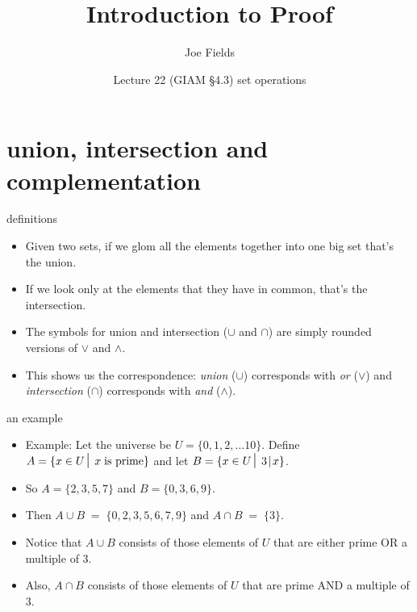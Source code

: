 \documentclass[handout,landscape]{beamer}
\author{Joe Fields}
\title{Introduction to Proof}
\date{Lecture 22 (GIAM \S 4.3) \newline set operations}
\institute[SCSU]{ {\tt fieldsj1@southernct.edu} }
\begin{document}
\begin{frame}[plain]
  \titlepage
\end{frame}

\section{union, intersection and complementation}

\begin{frame}{definitions}
\begin{itemize}
\item Given two sets, if we glom all the elements together into one big set that's the union. \pause
\item If we look only at the elements that they have in common, that's the intersection. \pause
\item The symbols for union and intersection ($\cup$ and $\cap$) are simply rounded versions of $\vee$ and $\wedge$. \pause
\item This shows us the correspondence: \pause \newline
 {\em union} ($\cup$) corresponds with  {\em or} ($\vee$) \pause \newline
and  {\em intersection} ($\cap$) corresponds with  {\em and} ($\wedge$). 
\end{itemize}
\end{frame}

\begin{frame}{an example}
\begin{itemize}
\item Example: Let the universe be $U = \{0,1,2, \ldots 10 \}$.  Define $A = \{x \in U \suchthat\; x \; \mbox{is prime} \}$ and let $B = \{x \in U \suchthat\; 3 \divides x \}$. \pause
\item So $A = \{2, 3, 5, 7\}$ \pause and $B = \{0,3,6,9\}$. \pause
\item Then $A \cup B \; = \; \{ 0, 2, 3, 5, 6, 7, 9 \}$ \pause \hspace{.2in} and $A \cap B \; = \; \{ 3 \}$. \pause
\item Notice that $A \cup B$ consists of those elements of $U$ that are either prime OR a multiple of 3. \pause
\item Also, $A \cap B$ consists of those elements of $U$ that are  prime AND a multiple of 3.
\end{itemize}
\end{frame}
\end{document}
